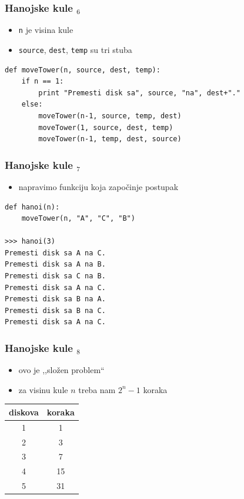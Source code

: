 \documentclass[utf8,compress]{beamer}
\begin{document}
\begin{frame}[fragile]
  \frametitle{Hanojske kule $_6$}
  \begin{itemize}
    \item \texttt{n} je visina kule
    \item \texttt{source}, \texttt{dest}, \texttt{temp} su tri stuba
  \end{itemize}
\begin{verbatim}
def moveTower(n, source, dest, temp):
    if n == 1:
        print "Premesti disk sa", source, "na", dest+"."
    else:
        moveTower(n-1, source, temp, dest)
        moveTower(1, source, dest, temp)
        moveTower(n-1, temp, dest, source)
\end{verbatim}
\end{frame}

\begin{frame}[fragile]
  \frametitle{Hanojske kule $_7$}
  \begin{itemize}
    \item napravimo funkciju koja započinje postupak
  \end{itemize}
\begin{verbatim}
def hanoi(n):
    moveTower(n, "A", "C", "B")

>>> hanoi(3)
Premesti disk sa A na C.
Premesti disk sa A na B.
Premesti disk sa C na B.
Premesti disk sa A na C.
Premesti disk sa B na A.
Premesti disk sa B na C.
Premesti disk sa A na C.
\end{verbatim}
\end{frame}

\begin{frame}[fragile]
  \frametitle{Hanojske kule $_8$}
  \begin{itemize}
    \item ovo je ,,složen problem``
    \item za visinu kule $n$ treba nam $2^n-1$ koraka
  \end{itemize}
\begin{center}
\begin{tabular}{cc}
\textbf{diskova} & \textbf{koraka} \\ \hline
1 & 1 \\
2 & 3 \\
3 & 7 \\
4 & 15 \\
5 & 31
\end{tabular}
\end{center}
\end{frame}
\end{document}
